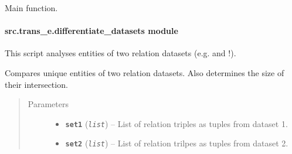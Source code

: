\documentclass[letterpaper,10pt,english]{sphinxmanual}
\begin{document}
\begin{fulllineitems}
\label{src.trans_e:src.trans_e.contains_entities.init_argparse}
\end{fulllineitems}


\begin{fulllineitems}
\label{src.trans_e:src.trans_e.contains_entities.main}
Main function.

\end{fulllineitems}



\paragraph{src.trans\_e.differentiate\_datasets module}
\label{src.trans_e:module-src.trans_e.differentiate_datasets}\label{src.trans_e:src-trans-e-differentiate-datasets-module}
This script analyses entities of two relation datasets (e.g.  and !).

\begin{fulllineitems}
\label{src.trans_e:src.trans_e.differentiate_datasets.compare_entities}
Compares unique entities of two relation datasets.
Also determines the size of their intersection.
\begin{quote}\begin{description}
\item[{Parameters}] \leavevmode\begin{itemize}
\item {} 
\textbf{\texttt{set1}} (\emph{\texttt{list}}) -- List of relation triples as tuples from dataset 1.

\item {} 
\textbf{\texttt{set2}} (\emph{\texttt{list}}) -- List of relation trilpes as tuples from dataset 2.

\end{itemize}

\end{description}\end{quote}

\end{fulllineitems}
\end{document}
